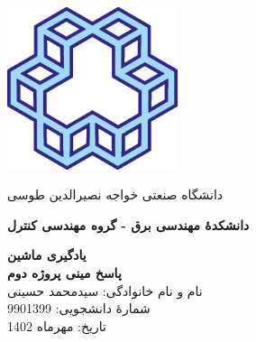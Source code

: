\begin{titlepage}
\begin{center}
\centerline{{\includegraphics[width=5cm]{img/Logo.png}}}
\centerline{\textcolor[rgb]{0,0,0.5}{\nast \large  دانشگاه صنعتی خواجه نصیرالدین طوسی}}
\centerline{\textcolor[rgb]{0,0,0.5}{\nast \bfseries دانشکدۀ مهندسی برق - گروه مهندسی کنترل}}

\vfill
        
\Huge
\textbf{یادگیری ماشین}\\
\textbf{پاسخ مینی پروژه دوم}\\
        
\vfill
\large
    نام و نام خانوادگی:  سیدمحمد حسینی\\
    شمارۀ دانشجویی: 9901399\\
    تاریخ: مهرماه 1402\\


\end{center}
\end{titlepage}

